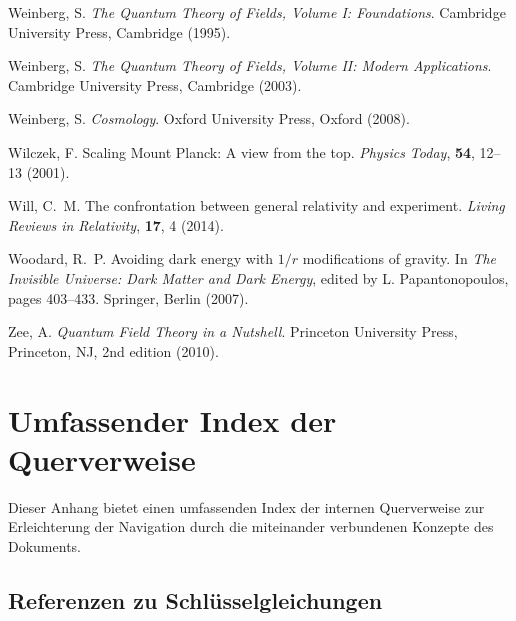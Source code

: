 \documentclass[12pt,a4paper]{article}
\begin{document}
\begin{thebibliography}{99}
		Weinberg, S.
		\newblock \textit{The Quantum Theory of Fields, Volume I: Foundations}.
		\newblock Cambridge University Press, Cambridge (1995).
		
		Weinberg, S.
		\newblock \textit{The Quantum Theory of Fields, Volume II: Modern Applications}.
		\newblock Cambridge University Press, Cambridge (2003).
		
		Weinberg, S.
		\newblock \textit{Cosmology}.
		\newblock Oxford University Press, Oxford (2008).
		
		Wilczek, F.
		\newblock Scaling Mount Planck: A view from the top.
		\newblock \textit{Physics Today}, \textbf{54}, 12--13 (2001).
		\newblock {}
		
		Will, C.~M.
		\newblock The confrontation between general relativity and experiment.
		\newblock \textit{Living Reviews in Relativity}, \textbf{17}, 4 (2014).
		\newblock {}
		
		Woodard, R.~P.
		\newblock Avoiding dark energy with $1/r$ modifications of gravity.
		\newblock In \textit{The Invisible Universe: Dark Matter and Dark Energy}, edited by L. Papantonopoulos, pages 403--433. Springer, Berlin (2007).
		\newblock {}
		
		Zee, A.
		\newblock \textit{Quantum Field Theory in a Nutshell}.
		\newblock Princeton University Press, Princeton, NJ, 2nd edition (2010).
		
	\end{thebibliography}
	
	\appendix
	
	\section{Umfassender Index der Querverweise}
	\label{app:cross_references}
	
	Dieser Anhang bietet einen umfassenden Index der internen Querverweise zur Erleichterung der Navigation durch die miteinander verbundenen Konzepte des Dokuments.
	
	\subsection{Referenzen zu Schlüsselgleichungen}
	\label{app:key_equations}
	
\end{document}
